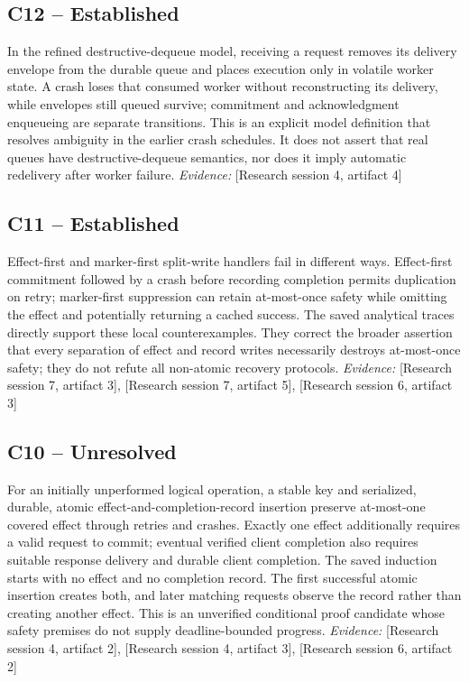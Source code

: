 \documentclass[11pt]{article}
\begin{document}
\begin{sloppypar}
\subsection{C12 -- Established}
In the refined destructive-dequeue model, receiving a request removes its delivery envelope from the durable queue and places execution only in volatile worker state. A crash loses that consumed worker without reconstructing its delivery, while envelopes still queued survive; commitment and acknowledgment enqueueing are separate transitions.
This is an explicit model definition that resolves ambiguity in the earlier crash schedules. It does not assert that real queues have destructive-dequeue semantics, nor does it imply automatic redelivery after worker failure.
\textit{Evidence: }[Research session 4, artifact 4]
\subsection{C11 -- Established}
Effect-first and marker-first split-write handlers fail in different ways. Effect-first commitment followed by a crash before recording completion permits duplication on retry; marker-first suppression can retain at-most-once safety while omitting the effect and potentially returning a cached success.
The saved analytical traces directly support these local counterexamples. They correct the broader assertion that every separation of effect and record writes necessarily destroys at-most-once safety; they do not refute all non-atomic recovery protocols.
\textit{Evidence: }[Research session 7, artifact 3], [Research session 7, artifact 5], [Research session 6, artifact 3]
\subsection{C10 -- Unresolved}
For an initially unperformed logical operation, a stable key and serialized, durable, atomic effect-and-completion-record insertion preserve at-most-one covered effect through retries and crashes. Exactly one effect additionally requires a valid request to commit; eventual verified client completion also requires suitable response delivery and durable client completion.
The saved induction starts with no effect and no completion record. The first successful atomic insertion creates both, and later matching requests observe the record rather than creating another effect. This is an unverified conditional proof candidate whose safety premises do not supply deadline-bounded progress.
\textit{Evidence: }[Research session 4, artifact 2], [Research session 4, artifact 3], [Research session 6, artifact 2]

\end{sloppypar}
\end{document}
